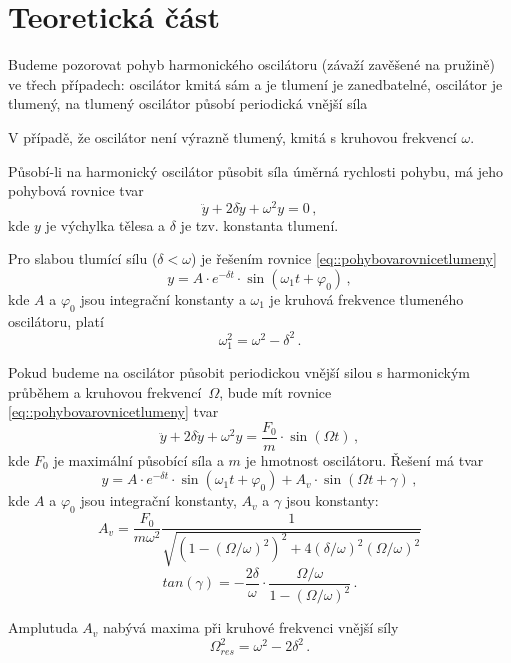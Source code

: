 \section*{Teoretická část}

Budeme pozorovat pohyb harmonického oscilátoru (závaží zavěšené na pružině) ve třech případech: oscilátor kmitá sám a je tlumení je zanedbatelné, oscilátor je tlumený, na tlumený oscilátor působí periodická vnější síla

V případě, že oscilátor není výrazně tlumený, kmitá s kruhovou frekvencí $\omega$.

Působí-li na harmonický oscilátor působit síla úměrná rychlosti pohybu, má jeho pohybová rovnice tvar
\begin{equation} \label{eq::pohybovarovnicetlumeny}
\ddot{y}+2\delta \dot{y}+\omega^2y=0 \,,
\end{equation}
kde $y$ je výchylka tělesa a $\delta$ je tzv. konstanta tlumení.

Pro slabou tlumící sílu ($\delta<\omega$) je řešením rovnice \eqref{eq::pohybovarovnicetlumeny}
\begin{equation}
y= A\cdot e^{-\delta t} \cdot \sin(\omega_1t+\varphi_0) \,,
\end{equation}
kde $A$ a $\varphi_0$ jsou integrační konstanty a $\omega_1$ je kruhová frekvence tlumeného oscilátoru, platí \cite{skripta}
\begin{equation} \label{eq::omega1}
\omega_1^2 = \omega^2 - \delta^2 \,.
\end{equation}

Pokud budeme na oscilátor působit periodickou vnější silou s harmonickým průběhem a kruhovou frekvencí~$\Omega$, bude mít rovnice \eqref{eq::pohybovarovnicetlumeny} tvar
\begin{equation}
\ddot{y} + 2\delta \dot{y} + \omega^2 y = \frac{F_0}{m}\cdot \sin(\Omega t) \,,
\end{equation}
kde $F_0$ je maximální působící síla a $m$ je hmotnost oscilátoru.
Řešení má tvar \cite{skripta}
\begin{equation}
y=A \cdot e^{-\delta t} \cdot \sin (\omega_1 t+ \varphi_0) + A_v \cdot \sin (\Omega t + \gamma) \,,
\end{equation}
kde $A$ a $\varphi_0$ jsou integrační konstanty, $A_v$ a $\gamma$ jsou konstanty: \cite{skripta}
\begin{equation}
A_v=\frac{F_0}{m \omega^2} \frac{1}{\sqrt{
\left( 1- (\Omega/\omega)^2  \right)^2 +
4 (\delta/\omega)^2(\Omega/\omega)^2
}} 
\end{equation}
\begin{equation}
tan (\gamma) =- \frac{2\delta}{\omega}\cdot \frac{\Omega/\omega}{1-(\Omega/\omega)^2} \,.
\end{equation}

Amplutuda $A_v$ nabývá maxima při kruhové frekvenci vnější síly
\begin{equation} \label{eq::resomega}
\Omega_{res}^2 = \omega^2-2\delta^2 \,.
\end{equation}